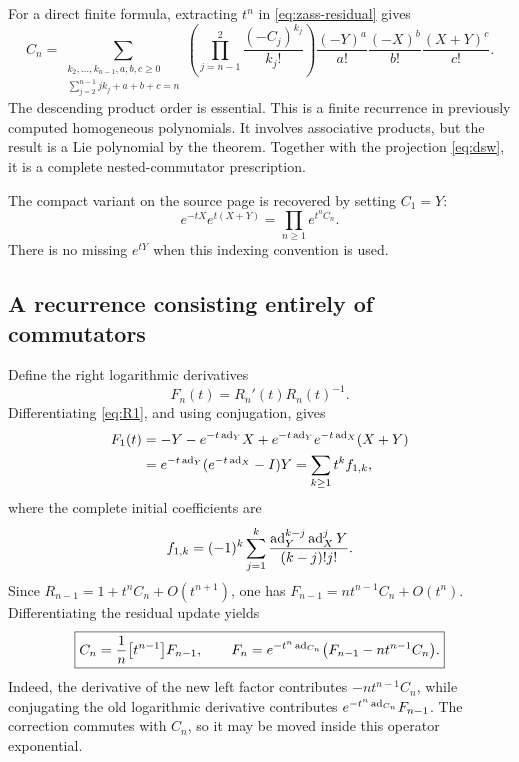 For a direct finite formula, extracting $t^n$ in \cref{eq:zass-residual} gives
\begin{equation}\label{eq:zass-finite-coeff}
 C_n=\sum_{\substack{k_2,\ldots,k_{n-1},a,b,c\geq0\\
                 \sum_{j=2}^{n-1}jk_j+a+b+c=n}}
 \left(\prod_{j=n-1}^{2}\frac{(-C_j)^{k_j}}{k_j!}\right)
 \frac{(-Y)^a}{a!}\frac{(-X)^b}{b!}\frac{(X+Y)^c}{c!}.
\end{equation}
The descending product order is essential. This is a finite recurrence in previously computed homogeneous polynomials. It involves associative products, but the result is a Lie polynomial by the theorem. Together with the projection \cref{eq:dsw}, it is a complete nested-commutator prescription.

The compact variant on the source page is recovered by setting $C_1=Y$:
\[
 e^{-tX}e^{t(X+Y)}=\prod_{n\geq1}e^{t^nC_n}.
\]
There is no missing $e^{tY}$ when this indexing convention is used.

\subsection{A recurrence consisting entirely of commutators}
Define the right logarithmic derivatives
\begin{equation}\label{eq:Fn}
 F_n(t)=R_n'(t)R_n(t)^{-1}.
\end{equation}
Differentiating \cref{eq:R1}, and using conjugation, gives
\begin{align}
 F_1(t)
 &=-Y-e^{-t\operatorname{ad}_Y}X+e^{-t\operatorname{ad}_Y}e^{-t\operatorname{ad}_X}(X+Y)\nonumber\\
 &=e^{-t\operatorname{ad}_Y}(e^{-t\operatorname{ad}_X}-I)Y
 =\sum_{k\geq1}t^k f_{1,k},\label{eq:F1}
\end{align}
where the complete initial coefficients are
\begin{equation}\label{eq:f1k}
 f_{1,k}=(-1)^k\sum_{j=1}^{k}
 \frac{\operatorname{ad}_Y^{k-j}\operatorname{ad}_X^jY}{(k-j)!j!}.
\end{equation}
Since $R_{n-1}=1+t^nC_n+O(t^{n+1})$, one has
$F_{n-1}=nt^{n-1}C_n+O(t^n)$. Differentiating the residual update yields
\begin{equation}\label{eq:zass-Lie-update}
 \boxed{\displaystyle
 C_n=\frac1n\bigl[t^{n-1}\bigr]F_{n-1},\qquad
 F_n=e^{-t^n\operatorname{ad}_{C_n}}\bigl(F_{n-1}-nt^{n-1}C_n\bigr).}
\end{equation}
Indeed, the derivative of the new left factor contributes $-nt^{n-1}C_n$, while conjugating the old logarithmic derivative contributes $e^{-t^n\operatorname{ad}_{C_n}}F_{n-1}$. The correction commutes with $C_n$, so it may be moved inside this operator exponential.

